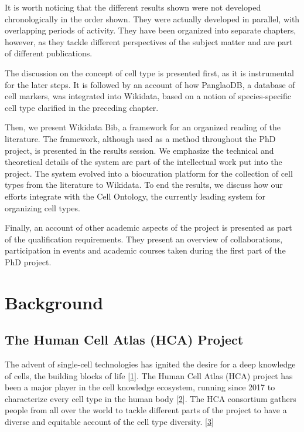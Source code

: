 It is worth noticing that the different results shown were not developed chronologically in the order shown.
They were actually developed in parallel, with overlapping periods of activity.
They have been organized into separate chapters, however, as they tackle different perspectives of the subject matter and are part of different publications.

The discussion on the concept of cell type is presented first, as it is instrumental for the later steps.
It is followed by an account of how PanglaoDB, a database of cell markers, was integrated into Wikidata, based on a notion of species-specific cell type clarified in the preceding chapter.

Then, we present Wikidata Bib, a framework for an organized reading of the literature.
The framework, although used as a method throughout the PhD project, is presented in the results session.
We emphasize the technical and theoretical details of the system are part of the intellectual work put into the project.
The system evolved into a biocuration platform for the collection of cell types from the literature to Wikidata.
To end the results, we discuss how our efforts integrate with the Cell Ontology, the currently leading system for organizing cell types.

Finally, an account of other academic aspects of the project is presented as part of the qualification requirements.
They present an overview of collaborations, participation in events and academic courses taken during the first part of the PhD project.

\hypertarget{background}{%
\section{Background}\label{background}}

\hypertarget{the-human-cell-atlas-hca-project}{%
\subsection{The Human Cell Atlas (HCA) Project}\label{the-human-cell-atlas-hca-project}}

The advent of single-cell technologies has ignited the desire for a deep knowledge of cells, the building blocks of life {[}\protect\hyperlink{ref-pNGap1Du}{1}{]}.
The Human Cell Atlas (HCA) project has been a major player in the cell knowledge ecosystem, running since 2017 to characterize every cell type in the human body {[}\protect\hyperlink{ref-1GmbExweg}{2}{]}.
The HCA consortium gathers people from all over the world to tackle different parts of the project to have a diverse and equitable account of the cell type diversity. {[}\protect\hyperlink{ref-tjdjR2Xf}{3}{]}

